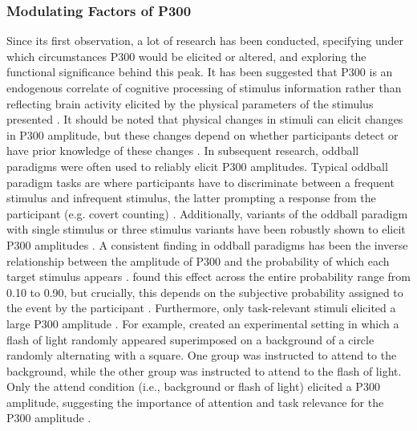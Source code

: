 \subsubsection{Modulating Factors of P300}
Since its first observation, a lot of research has been conducted, specifying under which circumstances P300 would be elicited or altered, and exploring the functional significance behind this peak.  It has been suggested that P300 is an endogenous correlate of cognitive processing of stimulus information rather than reflecting brain activity elicited by the physical parameters of the stimulus presented \parencite{hopfingerInteractionsEndogenousExogenous2006,laceyCognitiveModulationTimedependent1980, pictonP300WaveHuman1992, pritchardPsychophysiologyP3001981}. It should be noted that physical changes in stimuli can elicit changes in P300 amplitude, but these changes depend on whether participants detect or have prior knowledge of these changes \parencite{donchinCognitivePsychophysiologyEndogenous1978}.
In subsequent research, oddball paradigms were often used to reliably elicit P300 amplitudes. Typical oddball paradigm tasks are where participants have to discriminate between a frequent stimulus and infrequent stimulus, the latter prompting a response from the participant (e.g. covert counting) \parencite{donchinCognitivePsychophysiologyEndogenous1978}. Additionally, variants of the oddball paradigm with single stimulus or three stimulus variants have been robustly shown to elicit P300 amplitudes \parencite{conroyNormativeVariationP3a2007, walshRelationshipP3bSingletrial2017}. A consistent finding in oddball paradigms has been the inverse relationship between the amplitude of P300 and the probability of which each target stimulus appears \parencite{donchinCognitivePsychophysiologyEndogenous1978}. \textcite{duncan-johnsonQuantifyingSurpriseVariation1977} found this effect across the entire probability range from 0.10 to 0.90, but crucially, this depends on the subjective probability assigned to the event by the participant \parencite{donchinCognitivePsychophysiologyEndogenous1978,pritchardPsychophysiologyP3001981}. Furthermore, only task-relevant stimuli elicited a large P300 amplitude \parencite{duncan-johnsonQuantifyingSurpriseVariation1977,polichUpdatingP300Integrative2007}. For example, \textcite{donchinAveragedEvokedPotentials1967} created an experimental setting in which a flash of light randomly appeared superimposed on a background of a circle randomly alternating with a square. One group was instructed to attend to the background, while the other group was instructed to attend to the flash of light. Only the attend condition (i.e., background or flash of light) elicited a P300 amplitude, suggesting the importance of attention and task relevance for the P300 amplitude \parencite{donchinCognitivePsychophysiologyEndogenous1978,pritchardPsychophysiologyP3001981}. 
